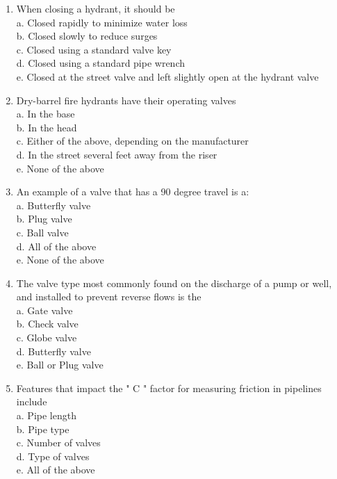 \begin{enumerate}[1.]
  \item When closing a hydrant, it should be\\
a. Closed rapidly to minimize water loss\\
b. Closed slowly to reduce surges\\
c. Closed using a standard valve key\\
d. Closed using a standard pipe wrench\\
e. Closed at the street valve and left slightly open at the hydrant valve\\

  \item Dry-barrel fire hydrants have their operating valves\\
a. In the base\\
b. In the head\\
c. Either of the above, depending on the manufacturer\\
d. In the street several feet away from the riser\\
e. None of the above\\

  \item An example of a valve that has a 90 degree travel is a:\\
a. Butterfly valve\\
b. Plug valve\\
c. Ball valve\\
d. All of the above\\
e. None of the above\\

  \item The valve type most commonly found on the discharge of a pump or well, and installed to prevent reverse flows is the\\
a. Gate valve\\
b. Check valve\\
c. Globe valve\\
d. Butterfly valve\\
e. Ball or Plug valve\\

  \item Features that impact the " C " factor for measuring friction in pipelines include\\
a. Pipe length\\
b. Pipe type\\
c. Number of valves\\
d. Type of valves\\
e. All of the above\\


\end{enumerate}
